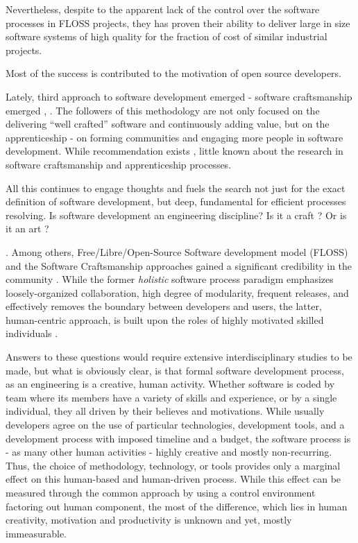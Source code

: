 Nevertheless, despite to the apparent lack of the control over the software processes in FLOSS projects, they 
has proven their ability to deliver large in size software systems of high quality for the fraction of cost 
of similar industrial projects.

Most of the success is contributed to the motivation of open source developers.

Lately, third approach to software development emerged - software craftsmanship emerged 
\cite{citeulike:11058561}, \cite{citeulike:11058554}. The followers of this methodology 
are not only focused on the delivering ``well crafted'' software and continuously adding value,
but on the apprenticeship - on forming communities and engaging more people in software development.
While recommendation exists \cite{citeulike:11058784}, little known about the research 
in software craftsmanship and apprenticeship processes.

All this continues to engage thoughts and fuels the search not just for the exact definition 
of software development, but deep, fundamental for efficient processes resolving. 
Is software development an engineering discipline? Is it a craft \cite{citeulike:5203446}? 
Or is it an art \cite{citeulike:11045694}?


. Among others, 
Free/Libre/Open-Source Software development model (FLOSS) and the Software Craftsmanship 
approaches gained a significant credibility in the community \cite{citeulike:3729379}. 
While the former \textit{holistic} software process paradigm emphasizes loosely-organized 
collaboration, high degree of modularity, frequent releases, and effectively removes the boundary 
between developers and users, the latter, human-centric approach, is built upon the roles of highly 
motivated skilled individuals \cite{citeulike:262020} \cite{citeulike:2759198}. 

Answers to these questions would require extensive interdisciplinary studies to be made, 
but what is obviously clear, is that formal software development process, as an engineering 
is a creative, human activity. 
Whether software is coded 
by team where its members have a variety of skills and experience, or by a single individual,
they all driven by their believes and motivations. While usually developers agree on the use of 
particular technologies, development tools, and a development process with imposed timeline and 
a budget, the software process is - as many other human activities - highly creative and mostly 
non-recurring. Thus, the choice of methodology, technology, or tools provides only a marginal 
effect on this human-based and human-driven process. While this effect can be measured through 
the common approach by using a control environment factoring out human component, the most of 
the difference, which lies in human creativity, motivation and productivity is unknown and yet, 
mostly immeasurable.

